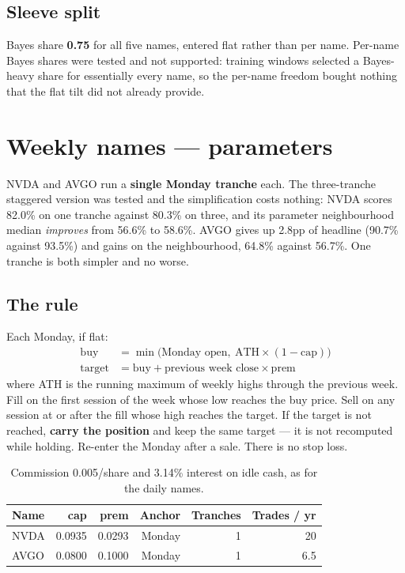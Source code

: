 \documentclass[11pt]{article}
\begin{document}
\subsection{Sleeve split}

Bayes share \textbf{0.75} for all five names, entered flat rather than per name. Per-name Bayes
shares were tested and not supported: training windows selected a Bayes-heavy share for
essentially every name, so the per-name freedom bought nothing that the flat tilt did not
already provide.

\section{Weekly names --- parameters}

NVDA and AVGO run a \textbf{single Monday tranche} each. The three-tranche staggered version was
tested and the simplification costs nothing: NVDA scores 82.0\% on one tranche against 80.3\% on
three, and its parameter neighbourhood median \emph{improves} from 56.6\% to 58.6\%. AVGO gives
up 2.8pp of headline (90.7\% against 93.5\%) and gains on the neighbourhood, 64.8\% against
56.7\%. One tranche is both simpler and no worse.

\subsection{The rule}

Each Monday, if flat:
\begin{align*}
\text{buy} &= \min\bigl(\text{Monday open},\ \text{ATH}\times(1-\text{cap})\bigr)\\
\text{target} &= \text{buy} + \text{previous week close}\times\text{prem}
\end{align*}
where ATH is the running maximum of weekly highs through the previous week. Fill on the first
session of the week whose low reaches the buy price. Sell on any session at or after the fill
whose high reaches the target. If the target is not reached, \textbf{carry the position} and keep
the same target --- it is not recomputed while holding. Re-enter the Monday after a sale.
There is no stop loss.

\begin{table}[H]\centering\small
\begin{tabular}{lrrrrr}
\toprule
\textbf{Name} & \textbf{cap} & \textbf{prem} & \textbf{Anchor} & \textbf{Tranches} &
\textbf{Trades / yr}\\
\midrule
\rowcolor{bckeep} NVDA & 0.0935 & 0.0293 & Monday & 1 & 20\\
AVGO & 0.0800 & 0.1000 & Monday & 1 & 6.5\\
\bottomrule
\end{tabular}
\caption{Commission 0.005/share and 3.14\% interest on idle cash, as for the daily names.}
\end{table}
\end{document}
